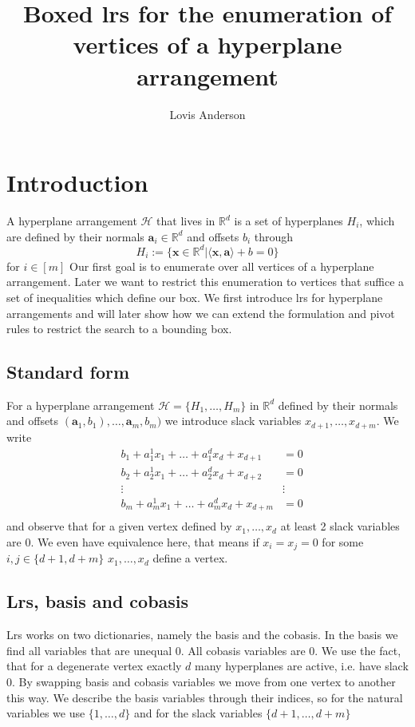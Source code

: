 \documentclass[]{article}
\title{Boxed lrs for the enumeration of vertices of a hyperplane arrangement}
\author{Lovis Anderson}
\theoremstyle{definition}
\theoremstyle{remark}
\begin{document}
\maketitle

\begin{abstract}

\end{abstract}
\section{Introduction}
A hyperplane arrangement $\mathcal{H}$ that lives in $\mathbb{R}^d$ is a set of hyperplanes $H_i$, which are defined by their normals $\bm{a}_i \in \mathbb{R}^d$ and offsets $b_i$ through
$$H_i := \{\bm{x} \in \mathbb{R}^d \vert \langle \bm{x}, \bm{a} \rangle + b = 0 \}$$
 for $i \in [m]$ Our first goal is to enumerate over all vertices of a hyperplane arrangement. Later we want to restrict this enumeration to vertices that suffice a set of inequalities which define our box. We first introduce lrs for hyperplane arrangements and will later show how we can extend the formulation and pivot rules to restrict the search to a bounding box.
\subsection{Standard form}
For a hyperplane arrangement $\mathcal{H} = \{H_1, \dots , H_m\}$ in $\mathbb{R}^d$ defined by their normals and offsets $(\bm{a}_1, b_1), \dots,  \bm{a}_m, b_m)$ we introduce slack variables $x_{d+1}, \dots , x_{d+m}$. We write
\begin{align*}
&b_1+ a_1^1x_1 +	\dots	 +a_1^d x_d +  x_{d+1}	& = 0 \\
&b_2+ a_2^1x_1 +	\dots	 +a_2^d x_d +  x_{d+2} 	&= 0 \\
&\vdots 		 				 					&\vdots \\
&b_m+ a_m^1x_1 +	\dots	 +a_m^d x_d +  x_{d+m} 	&= 0 \\
\end{align*}
and observe that for a given vertex defined by $x_1, \dots, x_d$ at least 2 slack variables are $0$. We even have equivalence here, that means if $x_i = x_j = 0$ for some $i,j \in \{d+1, d+m\}$ $x_1, \dots, x_d$ define a vertex.
\subsection{Lrs, basis and cobasis}
Lrs works on two dictionaries, namely the basis and the cobasis. In the basis we find all variables that are unequal $0$. All cobasis variables are $0$. We use the fact, that for a degenerate vertex exactly $d$ many hyperplanes are active, i.e. have slack $0$. By swapping basis and cobasis variables we move from one vertex to another this way. We describe the basis variables through their indices, so for the natural variables we use $\{1, \dots, d\}$ and for the slack variables $\{d+1, \dots, d+m\}$
\end{document}

